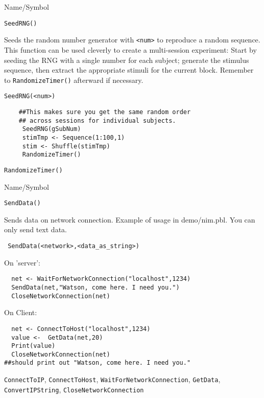 \begin{desc}{Name/Symbol}
\item[Name/Symbol]   \verb+SeedRNG()+

\item[Description] Seeds the random number generator with \verb+<num>+
  to reproduce a random sequence.  This function can be used cleverly
  to create a multi-session experiment: Start by seeding the RNG with
  a single number for each subject; generate the stimulus sequence,
  then extract the appropriate stimuli for the current block. Remember
  to \verb+RandomizeTimer()+ afterward if necessary.

\item[Usage] 
\begin{verbatim}
SeedRNG(<num>) 
\end{verbatim}

\item[Example]	

\begin{verbatim}
    ##This makes sure you get the same random order 
    ## across sessions for individual subjects.
     SeedRNG(gSubNum)
     stimTmp <- Sequence(1:100,1)
     stim <- Shuffle(stimTmp)
     RandomizeTimer()
\end{verbatim}

\item[See Also]	
     \verb+RandomizeTimer()+
\end{desc}

\rl

\begin{desc}{Name/Symbol}
\item[Name/Symbol]	\verb+SendData()+

\item[Description]	Sends data on network connection.  Example of
  usage in demo/nim.pbl. You can only send text data.

\item[Usage]
\begin{verbatim}
 SendData(<network>,<data_as_string>)
\end{verbatim}

\item[Example]	

On 'server':
\begin{verbatim}
  net <- WaitForNetworkConnection("localhost",1234)
  SendData(net,"Watson, come here. I need you.")
  CloseNetworkConnection(net)
\end{verbatim}
On Client:
\begin{verbatim}
  net <- ConnectToHost("localhost",1234)
  value <-  GetData(net,20)
  Print(value)
  CloseNetworkConnection(net)
##should print out "Watson, come here. I need you."
\end{verbatim}
\item[See Also]
  \verb+ConnectToIP+, \verb+ConnectToHost+, \verb+WaitForNetworkConnection+, \verb+GetData+, \verb+ConvertIPString+, \verb+CloseNetworkConnection+
\end{desc}

